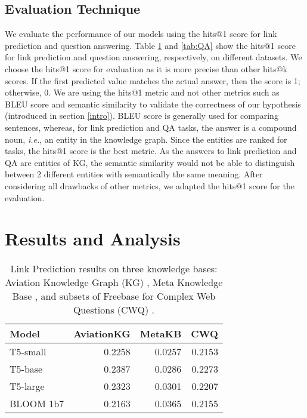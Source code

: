 \documentclass[11pt]{article}
\begin{document}
\subsection{Evaluation Technique}
\label{eval-tech}
We evaluate the performance of our models using the hits@1 score for link prediction and question answering. Table \ref{tab:link-prediction} and \ref{tab:QA} show the hits@1 score for link prediction and question answering, respectively, on different datasets. We choose the hits@1 score for evaluation as it is more precise than other hits@k scores. If the first predicted value matches the actual answer, then the score is 1; otherwise, 0. We are using the hits@1 metric and not other metrics such as BLEU score \cite{papineni2002bleu} and semantic similarity \cite{miller1991contextual} to validate the correctness of our hypothesis (introduced in section \ref{intro}). BLEU score is generally used for comparing sentences, whereas, for link prediction and QA tasks, the answer is a compound noun, \textit{i.e.}, an entity in the knowledge graph. Since the entities are ranked for tasks, the hits@1 score is the best metric. As the answers to link prediction and QA are entities of KG, the semantic similarity would not be able to distinguish between 2 different entities with semantically the same meaning. After considering all drawbacks of other metrics, we adapted the hits@1 score for the evaluation.





\section{Results and Analysis}
\label{results}

\begin{table}[!]
  \begin{center}
    \begin{tabular}{lrrr} 
    \hline
      \textbf{Model} & \textbf{AviationKG} & \textbf{MetaKB} & \textbf{CWQ}\\
      \hline
      T5-small & 0.2258 & 0.0257 & 0.2153\\
      T5-base & 0.2387 & 0.0286 & 0.2273\\
      T5-large & 0.2323 & 0.0301 & 0.2207 \\
      BLOOM 1b7 & 0.2163 & 0.0365 & 0.2155 \\
      \hline
    \end{tabular}
        \caption{Link Prediction results on three knowledge bases: Aviation Knowledge Graph (KG) \cite{agarwal2022knowledge}, Meta Knowledge Base \cite{zhang2018variational}, and subsets of Freebase \cite{chah2017freebase} for Complex Web Questions (CWQ) \cite{talmor2018web}. }
    \label{tab:link-prediction}
  \end{center}
\end{table}
\end{document}
